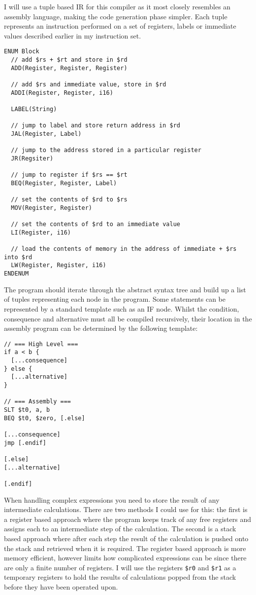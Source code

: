 I will use a tuple based IR for this compiler as it most closely resembles an assembly language, making the code generation phase simpler. Each tuple represents an instruction performed on a set of registers, labels or immediate values described earlier in my instruction set.

\begin{lstlisting}
ENUM Block
  // add $rs + $rt and store in $rd
  ADD(Register, Register, Register) 

  // add $rs and immediate value, store in $rd
  ADDI(Register, Register, i16)   

  LABEL(String)

  // jump to label and store return address in $rd
  JAL(Register, Label)       

  // jump to the address stored in a particular register 
  JR(Regsiter)           

  // jump to register if $rs == $rt
  BEQ(Register, Register, Label) 

  // set the contents of $rd to $rs
  MOV(Register, Register)   

  // set the contents of $rd to an immediate value 
  LI(Register, i16)       

  // load the contents of memory in the address of immediate + $rs into $rd
  LW(Register, Register, i16) 
ENDENUM
\end{lstlisting}

The program should iterate through the abstract syntax tree and build up a list of tuples representing each node in the program. Some statements can be represented by a standard template such as an IF node. Whilst the condition, consequence and alternative must all be compiled recursively, their location in the assembly program can be determined by the following template:

\begin{lstlisting}
// === High Level === 
if a < b {
  [...consequence]
} else {
  [...alternative]
}

// === Assembly ===
SLT $t0, a, b
BEQ $t0, $zero, [.else]

[...consequence] 
jmp [.endif]

[.else]
[...alternative] 

[.endif]
\end{lstlisting}

When handling complex expressions you need to store the result of any intermediate calculations. There are two methods I could use for this: the first is a register based approach where the program keeps track of any free registers and assigns each to an intermediate step of the calculation. The second is a stack based approach where after each step the result of the calculation is pushed onto the stack and retrieved when it is required. The register based approach is more memory efficient, however limits how complicated expressions can be since there are only a finite number of registers. I will use the registers \texttt{\$r0} and \texttt{\$r1} as a temporary registers to hold the results of calculations popped from the stack before they have been operated upon.

